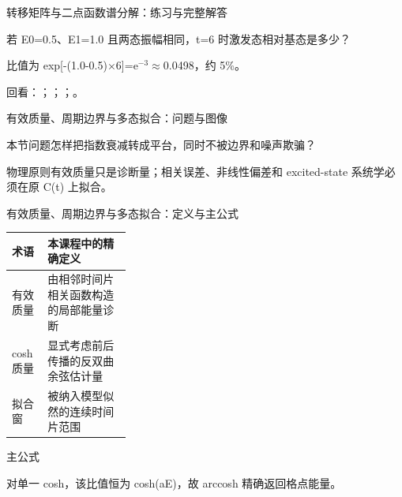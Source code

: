 \begin{frame}[t]{转移矩阵与二点函数谱分解：练习与完整解答}
\footnotesize
\begin{block}{}若 E0=0.5、E1=1.0 且两态振幅相同，t=6 时激发态相对基态是多少？\end{block}
\begin{exampleblock}{}比值为 exp[-(1.0-0.5)\ensuremath{\times}6]=e\ensuremath{^{-3}}\ensuremath{\approx}0.0498，约 5\%。\end{exampleblock}
\vfill
\scriptsize 回看：；；；。
\end{frame}

\begin{frame}[t]{有效质量、周期边界与多态拟合：问题与图像}
\footnotesize
\begin{block}{本节问题}怎样把指数衰减转成平台，同时不被边界和噪声欺骗？\end{block}
\begin{block}{物理原则}\quad 有效质量只是诊断量；相关误差、非线性偏差和 excited-state 系统学必须在原 C(t) 上拟合。\end{block}
\end{frame}

\begin{frame}[t]{有效质量、周期边界与多态拟合：定义与主公式}
\footnotesize\begin{tabularx}{\linewidth}{p{0.30\linewidth}Y}
\toprule 术语 & 本课程中的精确定义\\\midrule
{} 有效质量 & 由相邻时间片相关函数构造的局部能量诊断\\
 cosh 质量 & 显式考虑前后传播的反双曲余弦估计量\\
 拟合窗 & 被纳入模型似然的连续时间片范围\\
\bottomrule\end{tabularx}\vspace{0.15cm}
\begin{block}{ 主公式}\centering{}\end{block}
对单一 cosh，该比值恒为 cosh(aE)，故 arccosh 精确返回格点能量。
\end{frame}

